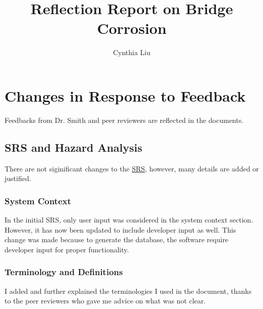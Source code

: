 \documentclass{article}
\title{Reflection Report on Bridge Corrosion}
\author{Cynthia Liu}
\date{}
\begin{document}
\maketitle


\section{Changes in Response to Feedback}
Feedbacks from Dr. Smith and peer reviewers are reflected in the documents.


\subsection{SRS and Hazard Analysis}
There are not siginificant changes to the \href{https://github.com/CynthiaLiu0805/BridgeCorrosion/blob/main/docs/SRS/SRS.pdf}{SRS}, however, many details are added or justified. 

\subsubsection{System Context}
In the initial SRS, only user input was considered in the system context section. However, it has now been updated to include developer input as well. This change was made because to generate the database, the software require developer input for proper functionality.

\subsubsection{Terminology and Definitions}
I added and further explained the terminologies I used in the document, thanks to the peer reviewers who gave me advice on what was not clear.
\end{document}
